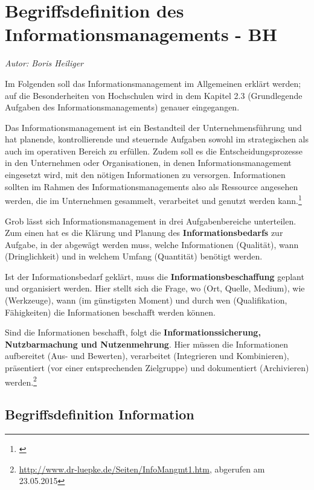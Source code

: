 \section{Begriffsdefinition des Informationsmanagements - BH}
\label{begriffsdefinition_inm}
\textit{Autor: Boris Heiliger}


Im Folgenden soll das Informationsmanagement im Allgemeinen erklärt werden; auf die Besonderheiten von Hochschulen wird in dem Kapitel 2.3 (Grundlegende Aufgaben des Informationsmanagements) genauer eingegangen.

Das Informationsmanagement ist ein Bestandteil der Unternehmensführung und hat planende, kontrollierende und steuernde Aufgaben sowohl im strategischen als auch im operativen Bereich zu erfüllen. Zudem soll es die Entscheidungsprozesse in den Unternehmen oder Organisationen, in denen Informationsmanagement eingesetzt wird, mit den nötigen Informationen zu versorgen. Informationen sollten im Rahmen des Informationsmanagements also als Ressource angesehen werden, die im Unternehmen gesammelt, verarbeitet und genutzt werden kann.\footnote{\cite[65-68]{voss_informationsmanagement_2001}}

Grob lässt sich Informationsmanagement in drei Aufgabenbereiche unterteilen. Zum einen hat es die Klärung und Planung des \textbf{Informationsbedarfs} zur Aufgabe, in der abgewägt werden muss, welche Informationen (Qualität), wann (Dringlichkeit) und in welchem Umfang (Quantität) benötigt werden.

Ist der Informationsbedarf geklärt, muss die \textbf{Informationsbeschaffung} geplant 
und organisiert werden. Hier stellt sich die Frage, wo (Ort, Quelle, Medium), wie (Werkzeuge), wann (im günstigsten Moment) und durch wen (Qualifikation, Fähigkeiten) die Informationen beschafft werden können.

Sind die Informationen beschafft, folgt die \textbf{Informationssicherung, Nutzbarmachung und Nutzenmehrung}. Hier müssen die Informationen aufbereitet (Aus- und Bewerten), verarbeitet (Integrieren und Kombinieren), präsentiert (vor einer entsprechenden Zielgruppe) und dokumentiert (Archivieren) werden.\footnote{\url{http://www.dr-luepke.de/Seiten/InfoMangmt1.htm}, abgerufen am 23.05.2015}

\subsection{Begriffsdefinition Information}

